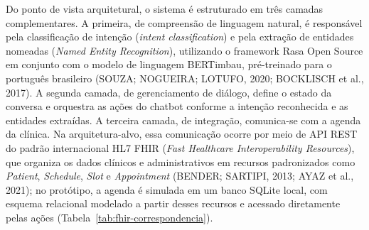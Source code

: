 \documentclass[12pt,a4paper]{extarticle}
\begin{document}
Do ponto de vista arquitetural, o sistema é estruturado em três camadas complementares. A primeira, de compreensão de linguagem natural, é responsável pela classificação de intenção (\textit{intent classification}) e pela extração de entidades nomeadas (\textit{Named Entity Recognition}), utilizando o framework Rasa Open Source em conjunto com o modelo de linguagem BERTimbau, pré-treinado para o português brasileiro (SOUZA; NOGUEIRA; LOTUFO, 2020; BOCKLISCH et al., 2017). A segunda camada, de gerenciamento de diálogo, define o estado da conversa e orquestra as ações do chatbot conforme a intenção reconhecida e as entidades extraídas. A terceira camada, de integração, comunica-se com a agenda da clínica. Na arquitetura-alvo, essa comunicação ocorre por meio de API REST do padrão internacional HL7 FHIR (\textit{Fast Healthcare Interoperability Resources}), que organiza os dados clínicos e administrativos em recursos padronizados como \textit{Patient}, \textit{Schedule}, \textit{Slot} e \textit{Appointment} (BENDER; SARTIPI, 2013; AYAZ et al., 2021); no protótipo, a agenda é simulada em um banco SQLite local, com esquema relacional modelado a partir desses recursos e acessado diretamente pelas ações (Tabela~\ref{tab:fhir-correspondencia}).
\end{document}
